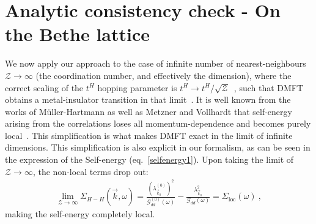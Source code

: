 \documentclass[reprint,hidelinks]{revtex4-2}
\begin{document}
\section{Analytic consistency check - On the Bethe lattice}
We now apply our approach to the case of infinite number of nearest-neighbours $\mathcal{Z}\to\infty$ (the coordination number, and effectively the dimension), where the correct scaling of the $t^{H}$ hopping parameter is $t^{H}\to t^{H}/\sqrt{\mathcal{Z}}$~\cite{metzner_volhardt_1989,georges_kotliar_1992,pruschke_cox_jarrel_1993}, such that DMFT obtains a metal-insulator transition in that limit~\cite{georges1996}. It is well known from the works of Müller-Hartmann as well as Metzner and Vollhardt that self-energy arising from the correlations loses all momentum-dependence and becomes purely local~\cite{Muller-Hartmann1989,metzner_volhardt_1989}. This simplification is what makes DMFT exact in the limit of infinite dimensions. This simplification is also explicit in our formalism, as can be seen in the expression of the Self-energy (eq.~\eqref{selfenergy1}). Upon taking the limit of \(\mathcal{Z}\to\infty\), the non-local terms drop out:
\begin{equation}\begin{aligned}
	\lim_{\mathcal{Z}\to\infty}\Sigma_{H-H}(\vec k,\omega) = \frac{\left(\lambda_{\vec k_0}^{(0)}\right)^2}{\mathcal{G}^{(0)}_{dd}(\omega)} - \frac{\lambda_{\vec k_0}^2}{\mathcal{G}_{dd}(\omega)} = \Sigma_\text{loc}(\omega)~,
\end{aligned}\end{equation}
making the self-energy completely local.
\end{document}
